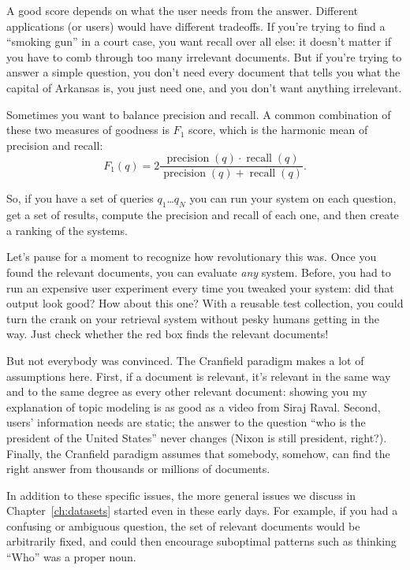 A good score depends on what the user needs from the answer.
Different applications (or users) would have different tradeoffs.
%
If you're trying to find a ``smoking gun'' in a court case, you want
recall over all else: it doesn't matter if you have to comb through
too many irrelevant documents.
%
But if you're trying to answer a simple question, you don't need every
document that tells you what the capital of Arkansas is, you just need
one, and you don't want anything irrelevant.

Sometimes you want to balance precision and recall.  A common
combination of these two measures of goodness is $F_1$ score, which is
the harmonic mean of precision and recall:
\begin{equation}
  F_1(q) = 2 \frac{\operatorname{precision}(q) \cdot
    \operatorname{recall}(q)}{\operatorname{precision}(q) + \operatorname{recall}(q)}.
\label{eq:f-score}
\end{equation}

So, if you have a set of queries $q_1$\dots $q_N$ you can run your
system on each question, get a set of results, compute the precision
and recall of each one, and then create a ranking of the systems.

Let’s pause for a moment to recognize how revolutionary this was.
%
Once you found the relevant documents, you can evaluate \emph{any}
system.
%
Before, you had to run an expensive user experiment every time you
tweaked your system: did that output look good?
%
How about this one?
%
With a reusable test collection, you could turn the crank on your
retrieval system without pesky humans getting in the way.  Just check
whether the red box finds the relevant documents!

But not everybody was convinced.
%
The Cranfield paradigm makes a lot of assumptions here.
%
First, if a document is relevant, it’s relevant in the same way and to
the same degree as every other relevant document: showing you my
explanation of topic modeling is as good as a video from Siraj Raval.
Second, users’ information needs are static; the answer to the question
``who is the president of the United States'' never changes (Nixon is
still president, right?).
%
Finally, the Cranfield paradigm assumes that somebody, somehow, can
find the right answer from thousands or millions of documents.

In addition to these specific issues, the more general issues we discuss
in Chapter~\ref{ch:datasets} started even in these early days.
%
For example, if you had a confusing or ambiguous question, the set of
relevant documents would be arbitrarily fixed, and could then encourage
suboptimal patterns such as thinking ``Who'' was a proper noun.

